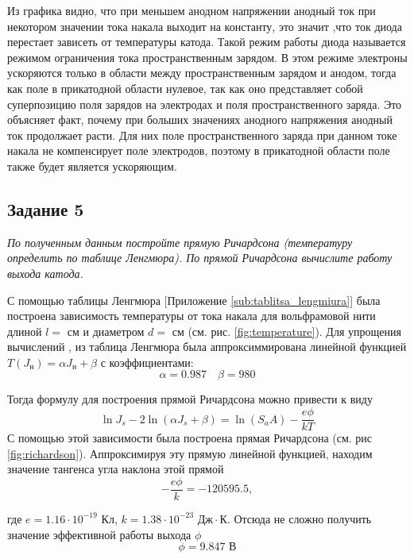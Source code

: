Из графика видно, что при меньшем анодном напряжении анодный ток при некотором значении тока накала выходит на константу, это значит ,что ток диода перестает зависеть от температуры катода. Такой режим работы диода называется режимом ограничения тока пространственным зарядом. В этом режиме электроны ускоряются только в области между пространственным зарядом и анодом, тогда как поле в прикатодной области нулевое, так как оно представляет собой суперпозицию поля зарядов на электродах и поля пространственного заряда. Это объясняет факт, почему при больших значениях анодного напряжения анодный ток продолжает расти. Для них поле пространственного заряда при данном токе накала не компенсирует поле электродов, поэтому в прикатодной области поле также будет является ускоряющим. 

\subsection{Задание 5}
\textit{По полученным данным постройте прямую Ричардсона (температуру
    определить по таблице Ленгмюра). По прямой Ричардсона вычислите работу
выхода катода.}


С помощью таблицы Ленгмюра [Приложение \ref{sub:tablitsa_lengmiura}] была построена
зависимость температуры от тока накала для вольфрамовой нити длиной $l=$ см и
диаметром  $d = $ см (см. рис. \ref{fig:temperature}). Для упрощения вычислений 
, из таблица Ленгмюра была аппроксиммирована линейной функцией $T(J_{\text{н}})
= \alpha J_{\text{н}} + \beta$ с коэффициентами:
\begin{equation}
    \label{eq:approx_lengmur}
    \alpha = 0.987 \quad \beta = 980
\end{equation}

Тогда формулу для построения прямой Ричардсона можно привести к виду
\begin{equation}
    \label{eq:richardson}
    \ln J_s - 2 \ln(\alpha J_s + \beta )= \ln(S_a A) - \frac{e \phi}{k T}
\end{equation}
С помощью этой зависимости
была построена прямая Ричардсона (см. рис \ref{fig:richardson}). Аппроксимируя
эту прямую линейной функцией, находим значение тангенса угла наклона этой
прямой
\begin{equation}
    - \frac{e \phi}{k} = -120595.5,
\end{equation}

где $e= 1.16\cdot 10^{-19}$ Кл, $k = 1.38\cdot 10^{-23} \text{ Дж} \cdot
\text{К}.$
Отсюда не сложно получить значение эффективной работы выхода $\phi$
 \begin{equation}
     \phi = 9.847 \text{ В}
\end{equation}

